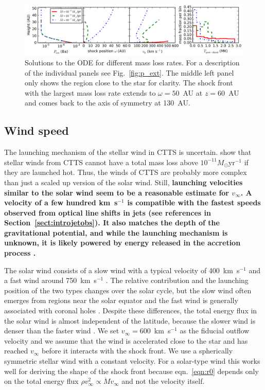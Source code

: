 \documentclass[manuscript]{aastex}
\begin{document}
\begin{figure}[h!]
\begin{center}
\includegraphics[width=1\columnwidth]{figures/dot_m/dot_m.png}
\caption{\label{fig:dot_m}
Solutions to the ODE for different mass loss rates. For a description of the individual panels see Fig.~\ref{fig:p_ext}. The middle left panel only shows the region close to the star for clarity. The shock front with the largest mass loss rate extends to $\omega=50$~AU at $z=60$~AU and comes back to the axis of symmetry at 130~AU.}
\end{center}
\end{figure}

\subsection{Wind speed}
The launching mechanism of the stellar wind in CTTS is uncertain. \citet{2007IAUS..243..299M} show that stellar winds from CTTS cannot have a total mass loss above $10^{-11}M_\odot\mathrm{ yr}^{-1}$ if they are launched hot. 
Thus, the winds of CTTS are probably more complex than just a scaled up version of the solar wind.
Still, \textbf{launching velocities similar to the solar wind seem to be a reasonable estimate for $v_\infty$. A velocity of a few hundred km~s$^{-1}$ is compatible with the fastest speeds observed from optical line shifts in jets (see references in Section~\ref{sect:introjetobs}). It also matches the depth of the gravitational potential, and while the launching mechanism is unknown, it is likely powered by energy released in the accretion process \citep{1988ApJ...332L..41K,2005ApJ...632L.135M}.}

The solar wind consists of a slow wind with a typical velocity of 400~km~s$^{-1}$ and a fast wind around 750~km~s$^{-1}$ \citep{2005JGRA..110.7109F}. The relative contribution and the launching position of the two types changes over the solar cycle, but the slow wind often emerges from regions near the solar equator and the fast wind is generally associated with coronal holes \citep{1999GeoRL..26.2901G,2003A&A...408.1165B,2009LRSP....6....3C}. Despite these differences, the total energy flux in the solar wind is almost independent of the latitude, because the slower wind is denser than the faster wind \citep{2012SoPh..279..197L}. We set $v_\infty=600$~km~s$^{-1}$ as the fiducial outflow velocity and we assume that the wind is accelerated close to the star and has reached $v_\infty$ before it interacts with the shock front. We use a spherically symmetric stellar wind with a constant velocity. For a solar-type wind this works well for deriving the shape of the shock front because eqn.~\ref{eqn:r0} depends only on the total energy flux $\rho v^2_\infty \propto \dot M v_\infty$ and not the velocity itself. 
\end{document}
